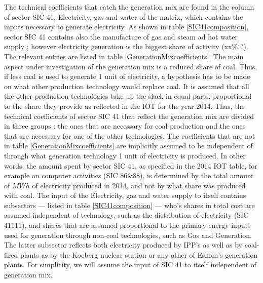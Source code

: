 \documentclass[12pt,english]{article}
\begin{document}
The technical coefficients that catch the generation mix are found in the column of sector SIC 41, Electricity, gas and water of the matrix, which contains the inputs necessary to generate electricity. As shown in table \ref{SIC41composition}, sector SIC 41 contains also the manufacture of gas and steam ad hot water supply ; however electricity generation is the biggest share of activity (xx\% ?). The relevant entries are listed in table \ref{GenerationMixcoefficients}. The main aspect under investigation of the generation mix is a reduced share of coal. Thus, if less coal is used to generate 1 unit of electricity, a hypothesis has to be made on what other production technology would replace coal. %
It is assumed that all the other production technologies take up the slack in equal parts, proportional to the share they provide as reflected in the IOT for the year 2014. Thus, the technical coefficients of sector SIC 41 that reflect the generation mix are divided in three groups : the ones that are necessary for coal production and the ones that are necessary for one of the other technologies. The coefficients that are not in table \ref{GenerationMixcoefficients} are implicitly assumed to be independent of through what generation technology 1 unit of electricity is produced. In other words, the amount spent by sector SIC 41, as specified in the 2014 IOT table, for example on computer activities (SIC 86\&88), is determined by the total amount of $MWh$ of electricity produced in 2014, and not by what share was produced with coal. The input of the Electricity, gas and water supply to itself contains subsectors --- listed in table \ref{SIC41composition} --- who's shares in total cost are assumed independent of technology, such as the distribution of electricity (SIC 41111), and shares that are assumed proportional to the primary energy inputs used for generation through non-coal technologies, such as Gas and Generation. The latter subsector reflects both electricity produced by IPP's as well as by coal-fired plants as by the Koeberg nuclear station or any other of Eskom's generation plants. For simplicity, we will assume the input of SIC 41 to itself independent of generation mix. 
\end{document}
